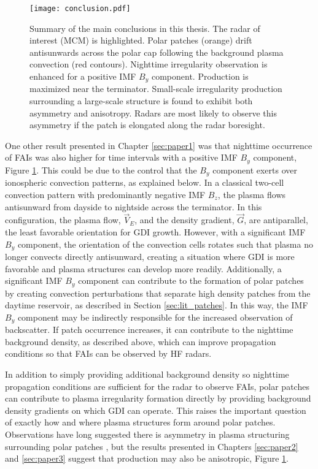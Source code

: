 \begin{figure}
  \texttt{[image: conclusion.pdf]}
  \caption[Irregularity production factors]{Summary of the main conclusions in this thesis.  The radar of interest (MCM) is highlighted.  Polar patches (orange) drift antisunwards across the polar cap following the background plasma convection (red contours).  Nighttime irregularity observation is enhanced for a positive IMF \(B_y\) component.  Production is maximized near the terminator.  Small-scale irregularity production surrounding a large-scale structure is found to exhibit both asymmetry and anisotropy.  Radars are most likely to observe this asymmetry if the patch is elongated along the radar boresight.}
  \label{fig:conclusion}
\end{figure}

One other result presented in Chapter \ref{sec:paper1} was that nighttime occurrence of FAIs was also higher for time intervals with a positive IMF \(B_y\) component, Figure \ref{fig:conclusion}.  This could be due to the control that the \(B_y\) component exerts over ionospheric convection patterns, as explained below.  In a classical two-cell convection pattern with predominantly negative IMF \(B_z\), the plasma flows antisunward from dayside to nightside across the terminator.  In this configuration, the plasma flow, \(\vec{V}_E\), and the density gradient, \(\vec{G}\), are antiparallel, the least favorable orientation for GDI growth.  However, with a significant IMF \(B_y\) component, the orientation of the convection cells rotates such that plasma no longer convects directly antisunward, creating a situation where GDI is more favorable and plasma structures can develop more readily.  Additionally, a significant IMF \(B_y\) component can contribute to the formation of polar patches by creating convection perturbations that separate high density patches from the daytime reservoir, as described in Section \ref{sec:lit_patches}.  In this way, the IMF \(B_y\) component may be indirectly responsible for the increased observation of backscatter.  If patch occurrence increases, it can contribute to the nighttime background density, as described above, which can improve propagation conditions so that FAIs can be observed by 
HF radars.

In addition to simply providing additional background density so nighttime propagation conditions are sufficient for the radar to observe FAIs, polar patches can contribute to plasma irregularity formation directly by providing background density gradients on which GDI can operate.  This raises the important question of exactly how and where plasma structures form around polar patches.  Observations have long suggested there is asymmetry in plasma structuring surrounding polar patches \citep{Weber1984,Milan2002b,Koustov2012}, but the results presented in Chapters \ref{sec:paper2} and \ref{sec:paper3} suggest that production may also be anisotropic, Figure \ref{fig:conclusion}.  

